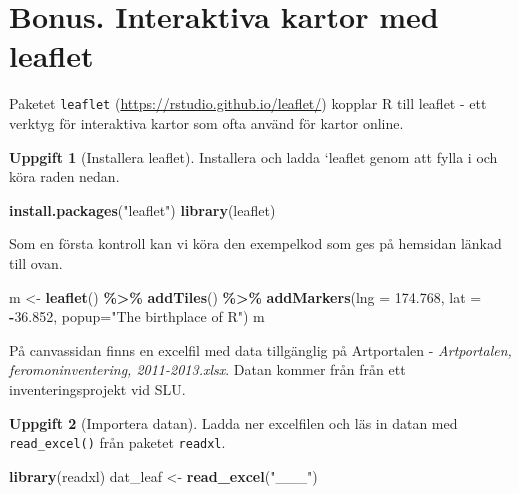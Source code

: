 \documentclass[
]{book}
\newenvironment{Shaded}{\begin{snugshade}}{\end{snugshade}}
\newcommand{\AttributeTok}[1]{\textcolor[rgb]{0.13,0.29,0.53}{#1}}
\newcommand{\FloatTok}[1]{\textcolor[rgb]{0.00,0.00,0.81}{#1}}
\newcommand{\FunctionTok}[1]{\textcolor[rgb]{0.13,0.29,0.53}{\textbf{#1}}}
\newcommand{\NormalTok}[1]{#1}
\newcommand{\OtherTok}[1]{\textcolor[rgb]{0.56,0.35,0.01}{#1}}
\newcommand{\SpecialCharTok}[1]{\textcolor[rgb]{0.81,0.36,0.00}{\textbf{#1}}}
\newcommand{\StringTok}[1]{\textcolor[rgb]{0.31,0.60,0.02}{#1}}
\theoremstyle{definition}
\theoremstyle{definition}
\theoremstyle{definition}
\newtheorem{exercise}{Uppgift}[chapter]
\theoremstyle{definition}
\theoremstyle{remark}
\begin{document}
\section{Bonus. Interaktiva kartor med leaflet}\label{bonus.-interaktiva-kartor-med-leaflet}

Paketet \texttt{leaflet} (\url{https://rstudio.github.io/leaflet/}) kopplar R till leaflet - ett verktyg för interaktiva kartor som ofta använd för kartor online.

\begin{exercise}[Installera leaflet]

Installera och ladda `leaflet genom att fylla i och köra raden nedan.

\begin{Shaded}
\begin{Highlighting}[]
\FunctionTok{install.packages}\NormalTok{(}\StringTok{"leaflet"}\NormalTok{)}
\FunctionTok{library}\NormalTok{(leaflet)}
\end{Highlighting}
\end{Shaded}

\end{exercise}

Som en första kontroll kan vi köra den exempelkod som ges på hemsidan länkad till ovan.

\begin{Shaded}
\begin{Highlighting}[]
\NormalTok{m }\OtherTok{\textless{}{-}} \FunctionTok{leaflet}\NormalTok{() }\SpecialCharTok{\%\textgreater{}\%}
  \FunctionTok{addTiles}\NormalTok{() }\SpecialCharTok{\%\textgreater{}\%}
  \FunctionTok{addMarkers}\NormalTok{(}\AttributeTok{lng =} \FloatTok{174.768}\NormalTok{, }\AttributeTok{lat =} \SpecialCharTok{{-}}\FloatTok{36.852}\NormalTok{, }
             \AttributeTok{popup=}\StringTok{"The birthplace of R"}\NormalTok{)}
\NormalTok{m}
\end{Highlighting}
\end{Shaded}

På canvassidan finns en excelfil med data tillgänglig på Artportalen - \emph{Artportalen, feromoninventering, 2011-2013.xlsx}. Datan kommer från från ett inventeringsprojekt vid SLU.

\begin{exercise}[Importera datan]

Ladda ner excelfilen och läs in datan med \texttt{read\_excel()} från paketet \texttt{readxl}.

\begin{Shaded}
\begin{Highlighting}[]
\FunctionTok{library}\NormalTok{(readxl)}
\NormalTok{dat\_leaf }\OtherTok{\textless{}{-}} \FunctionTok{read\_excel}\NormalTok{(}\StringTok{"\_\_\_"}\NormalTok{)}
\end{Highlighting}
\end{Shaded}

\end{exercise}
\end{document}
